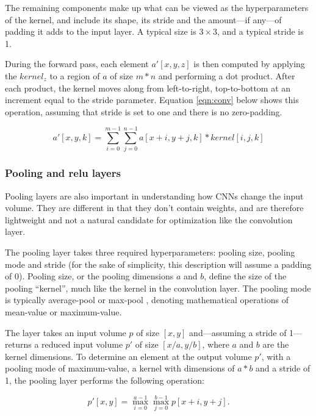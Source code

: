 The remaining components make up what can be viewed as the hyperparameters of the kernel, and include its shape, its stride and the amount---if any---of padding it adds to the input layer. A typical size is $3\times3$, and a typical stride is 1.

During the forward pass, each element $a'[x,y,z]$ is then computed by applying the $kernel_{z}$ to a region of $a$ of size $m*n$ and performing a dot product. After each product, the kernel moves along from left-to-right, top-to-bottom at an increment equal to the stride parameter. Equation \ref{eqn:conv} below shows this operation, assuming that stride is set to one and there is no zero-padding.

\begin{equation}
\label{eqn:conv}
a'[x,y,k] = \sum_{i=0}^{m-1}\sum_{j=0}^{n-1}{a[x+i,y+j,k] * kernel[i,j,k]}
\end{equation}

\subsubsection{Pooling and relu layers}
Pooling layers are also important in understanding how CNNs change the input volume. They are different in that they don't contain weights, and are therefore lightweight and not a natural candidate for optimization like the convolution layer.

The pooling layer takes three required hyperparameters: pooling size, pooling mode and stride (for the sake of simplicity, this description will assume a padding of 0). Pooling size, or the pooling dimensions $a$ and $b$, define the size of the pooling ``kernel'', much like the kernel in the convolution layer. The pooling mode is typically average-pool or max-pool \cite{convnets}, denoting mathematical operations of mean-value or maximum-value.

The layer takes an input volume $p$ of size $[x,y]$ and---assuming a stride of 1---returns a reduced input volume $p'$ of size $[x/a,y/b]$, where $a$ and $b$ are the kernel dimensions. To determine an element at the output volume $p'$, with a pooling mode of maximum-value, a kernel with dimensions of $a*b$ and a stride of 1, the pooling layer performs the following operation:

\begin{equation}
\label{eqn:pool}
p'[x,y] = \max_{i=0}^{a-1}\max_{j=0}^{b-1}{p[x+i,y+j]}.
\end{equation}

